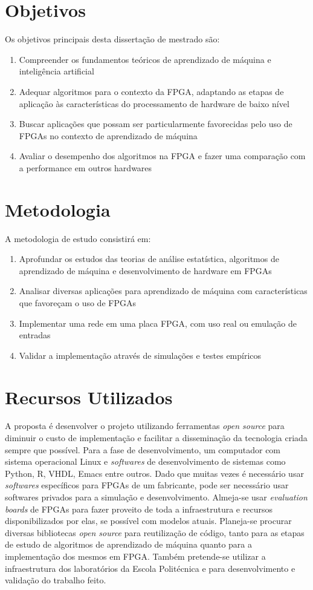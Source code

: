 \documentclass[
	12pt,				%
	oneside,			%
	a4paper,			%
	english,			%
	french,				%
	spanish,			%
	brazil,				%
	]{abntex2}
\begin{document}
\chapter*[Objetivos]{Objetivos}
Os objetivos principais desta dissertação de mestrado são:
\begin{enumerate}
    \item Compreender os fundamentos teóricos de aprendizado
      de máquina e inteligência artificial
    \item Adequar algoritmos para o contexto da FPGA, adaptando as etapas de
      aplicação às características do processamento de hardware de baixo
      nível
    \item Buscar aplicações que possam ser particularmente favorecidas pelo
      uso de FPGAs no contexto de aprendizado de máquina
    \item Avaliar o desempenho dos algoritmos na FPGA e fazer uma comparação
      com a performance em outros hardwares
\end{enumerate}

\chapter*[Metodologia]{Metodologia}
A metodologia de estudo consistirá em:
\begin{enumerate}
    \item Aprofundar os estudos das teorias de análise estatística,
      algoritmos de aprendizado de máquina e desenvolvimento de hardware em
      FPGAs
    \item Analisar diversas aplicações para aprendizado de máquina com
      características que favoreçam o uso de FPGAs
    \item Implementar uma rede em uma placa FPGA, com uso real ou emulação
      de entradas
    \item Validar a implementação através de simulações e testes empíricos
\end{enumerate}
	
\chapter*[Recursos Utilizados]{Recursos Utilizados}
A proposta é desenvolver o projeto utilizando ferramentas \textit{open
 source} para diminuir o custo de implementação e facilitar a
disseminação da tecnologia criada sempre que possível.
Para a fase de desenvolvimento, um computador com sistema operacional
Linux e \textit{softwares} de desenvolvimento de sistemas como Python,
R, VHDL, Emacs entre outros. Dado que muitas vezes é necessário usar
\textit{softwares} específicos para FPGAs de um fabricante, pode ser
necessário usar softwares privados para a simulação e desenvolvimento.
Almeja-se usar \textit{evaluation boards} de FPGAs para fazer proveito
de toda a infraestrutura e recursos disponibilizados por elas, se
possível com modelos atuais. Planeja-se procurar diversas bibliotecas
\textit{open source} para reutilização de código, tanto para as etapas
de estudo de algoritmos de aprendizado de máquina quanto para a
implementação dos mesmos em FPGA. Também pretende-se utilizar a
infraestrutura dos laboratórios da Escola Politécnica e para
desenvolvimento e validação do trabalho feito.
        
\end{document}
